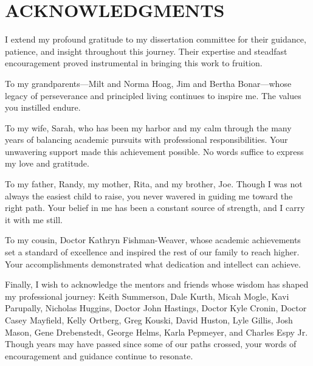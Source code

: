 \chapter*{\Large \uppercase{Acknowledgments}}
\label{chap:Acknowledgments}


I extend my profound gratitude to my dissertation committee for their guidance, patience, and insight throughout this journey. Their expertise and steadfast encouragement proved instrumental in bringing this work to fruition.

To my grandparents---Milt and Norma Hoag, Jim and Bertha Bonar---whose legacy of perseverance and principled living continues to inspire me. The values you instilled endure.

To my wife, Sarah, who has been my harbor and my calm through the many years of balancing academic pursuits with professional responsibilities. Your unwavering support made this achievement possible. No words suffice to express my love and gratitude.

To my father, Randy, my mother, Rita, and my brother, Joe. Though I was not always the easiest child to raise, you never wavered in guiding me toward the right path. Your belief in me has been a constant source of strength, and I carry it with me still.

To my cousin, Doctor Kathryn Fishman-Weaver, whose academic achievements set a standard of excellence and inspired the rest of our family to reach higher. Your accomplishments demonstrated what dedication and intellect can achieve.

Finally, I wish to acknowledge the mentors and friends whose wisdom has shaped my professional journey: Keith Summerson, Dale Kurth, Micah Mogle, Kavi Parupally, Nicholas Huggins, Doctor John Hastings, Doctor Kyle Cronin, Doctor Casey Mayfield, Kelly Ortberg, Greg Kouski, David Huston, Lyle Gillis, Josh Mason, Gene Drebenstedt, George Helms, Karla Pepmeyer, and Charles Espy Jr. Though years may have passed since some of our paths crossed, your words of encouragement and guidance continue to resonate.
